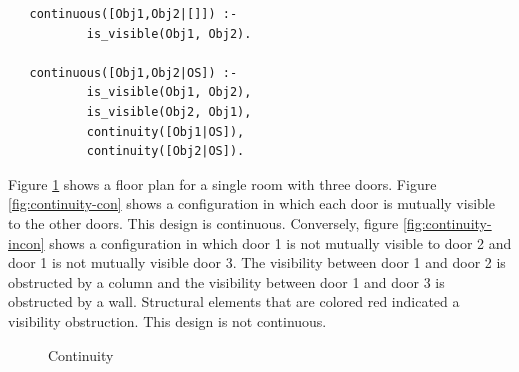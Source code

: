 \documentclass[12pt]{ucthesis}
\begin{document}
\begin{verbatim}
   continuous([Obj1,Obj2|[]]) :- 
           is_visible(Obj1, Obj2).

   continuous([Obj1,Obj2|OS]) :- 
           is_visible(Obj1, Obj2),
	       is_visible(Obj2, Obj1),
           continuity([Obj1|OS]),
           continuity([Obj2|OS]).
\end{verbatim}

Figure \ref{continuity} shows a floor plan for a single room with three doors. Figure \ref{fig:continuity-con} shows a configuration in which each door is mutually visible to the other doors. This design is continuous. Conversely, figure \ref{fig:continuity-incon} shows a configuration in which door 1 is not mutually visible to door 2 and door 1 is not mutually visible door 3. The visibility between door 1 and door 2 is obstructed by a column and the visibility between door 1 and door 3 is obstructed by a wall. Structural elements that are colored red indicated a visibility obstruction. This design is not continuous. 

\begin{figure}[H]
 \centering
  \hspace{30 mm}
 \caption{Continuity}
\label{continuity}
\end{figure}
\end{document}
